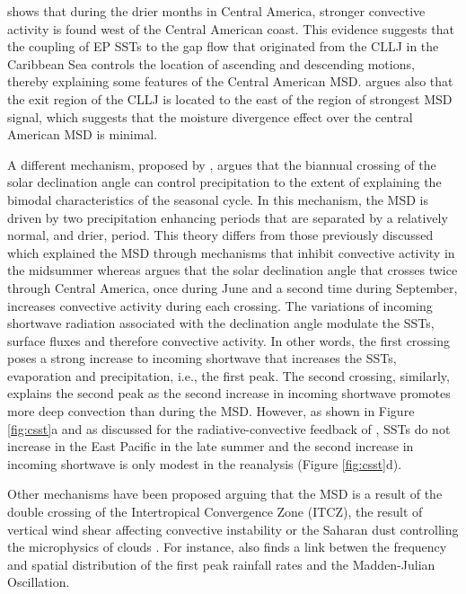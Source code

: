  \cite{herrera2015} shows that during the drier months in Central America, stronger convective activity is found west of the Central American coast.  This evidence suggests that the coupling of EP SSTs to the gap flow that originated from the CLLJ in the Caribbean Sea controls the location of ascending and descending motions, thereby explaining some features of the Central American MSD. 
\cite{herrera2015} argues also that the exit region of the CLLJ is located to the east of the region of strongest MSD signal, which suggests that the moisture divergence effect over the central American MSD is minimal. 


A different mechanism, proposed by \cite{karnauskas2013}, argues that the biannual crossing of the solar declination angle can control precipitation to the extent of explaining the bimodal characteristics of the seasonal cycle. In this mechanism, the MSD is driven by two precipitation enhancing periods that are separated by a relatively normal, and drier, period. This theory differs from those previously discussed which explained the MSD through mechanisms that inhibit convective activity in the midsummer whereas \cite{karnauskas2013} argues that the solar declination angle that crosses twice through Central America, once during June and a second time during September, increases convective activity during each crossing. The variations of incoming shortwave radiation associated with the declination angle modulate the SSTs, surface fluxes and therefore convective activity. In other words, the first crossing poses a strong increase to incoming shortwave that increases the SSTs, evaporation and precipitation, i.e., the first peak. The second crossing, similarly, explains the second peak as the second increase in incoming shortwave promotes more deep convection than during the MSD. However, as shown in Figure \ref{fig:csst}a and as discussed for the radiative-convective feedback of \cite{magana1999}, SSTs do not increase in the East Pacific in the late summer and the second increase in incoming shortwave is only modest in the reanalysis (Figure \ref{fig:csst}d). 


Other mechanisms have been proposed arguing that the MSD is a result of the double crossing of the Intertropical Convergence Zone (ITCZ), the result of vertical wind shear affecting convective instability or the Saharan dust controlling  the microphysics of clouds \citep{angeles2010origins}.
For instance, \cite{perdigon2019} also finds a link betwen the frequency and spatial distribution of the first peak rainfall rates and the Madden-Julian Oscillation. 

